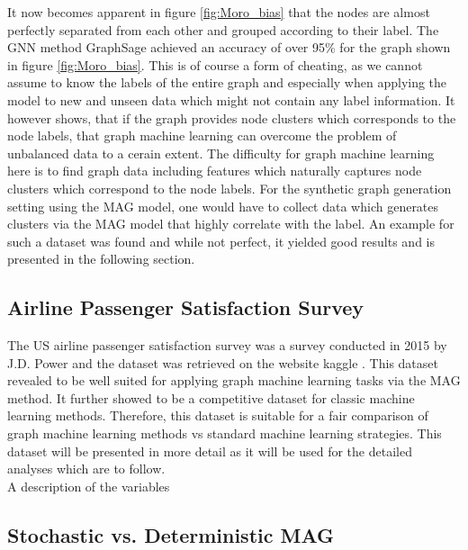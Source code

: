   \noindent It now becomes apparent in figure \ref{fig:Moro_bias} that the
  nodes are almost perfectly separated from each other and grouped according to 
  their label. The GNN method GraphSage achieved an accuracy of over 95\% for 
  the graph shown in figure \ref{fig:Moro_bias}. This is of course a form of 
  cheating, as we cannot assume to know the labels of the entire graph and 
  especially when applying the model to new and unseen data which might not 
  contain any label information. It however shows, that if the graph provides 
  node clusters which corresponds to the node labels, that graph machine 
  learning can overcome the problem of unbalanced data to a cerain extent. 
  The difficulty for graph machine learning here is to find graph data including 
  features which naturally captures node clusters which correspond to the node 
  labels. For the synthetic graph generation setting using the MAG model, one 
  would have to collect data which generates clusters via the MAG model that 
  highly correlate with the label. An example for such a dataset was found and 
  while not perfect, it yielded good results and is presented in the following 
  section. 

  \subsection{Airline Passenger Satisfaction Survey}
  
  The US airline passenger satisfaction survey was a survey conducted in 2015
  by J.D. Power and the dataset was retrieved on the website kaggle
  \citep{JDPower2015,KAGGLE2015}. This dataset revealed to be well suited for
  applying graph machine learning tasks via the MAG method. It further showed
  to be a competitive dataset for classic machine learning methods. Therefore,
  this dataset is suitable for a fair comparison of graph machine learning
  methods vs standard machine learning strategies. This dataset will be
  presented in more detail as it will be used for the detailed analyses which
  are to follow. \\

  \noindent A description of the variables 

  \subsection{Stochastic vs. Deterministic MAG}

